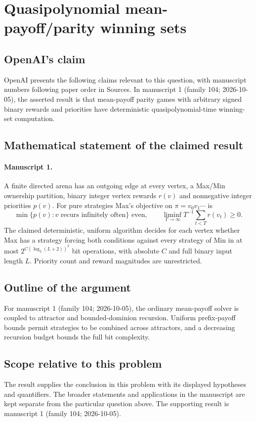 \documentclass[11pt]{article}
\begin{document}
\section*{Quasipolynomial mean-payoff/parity winning sets}

\subsection{OpenAI's claim}
OpenAI presents the following claims relevant to this question, with manuscript numbers following paper order in Sources. In manuscript 1 (family 104; 2026-10-05), the asserted result is that mean-payoff parity games with arbitrary signed binary rewards and priorities have deterministic quasipolynomial-time winning-set computation.

\subsection{Mathematical statement of the claimed result}
\paragraph{Manuscript 1.}
A finite directed arena has an outgoing edge at every vertex, a Max/Min ownership partition, binary integer vertex rewards $r(v)$ and nonnegative integer priorities $p(v)$. For pure strategies Max's objective on $\pi=v_0v_1\cdots$ is
\[
 \min\{p(v):v\text{ recurs infinitely often}\}\text{ even},\qquad
 \liminf_{T\to\infty}T^{-1}\sum_{t<T}r(v_t)\ge0.
\]
The claimed deterministic, uniform algorithm decides for each vertex whether Max has a strategy forcing both conditions against every strategy of Min in at most $2^{C(\log_2(L+2))^2}$ bit operations, with absolute $C$ and full binary input length $L$. Priority count and reward magnitudes are unrestricted.

\subsection{Outline of the argument}
For manuscript 1 (family 104; 2026-10-05), the ordinary mean-payoff solver is coupled to attractor and bounded-dominion recursion. Uniform prefix-payoff bounds permit strategies to be combined across attractors, and a decreasing recursion budget bounds the full bit complexity.

\subsection{Scope relative to this problem}
The result supplies the conclusion in this problem with its displayed hypotheses and quantifiers. The broader statements and applications in the manuscript are kept separate from the particular question above. The supporting result is manuscript 1 (family 104; 2026-10-05).
\end{document}
